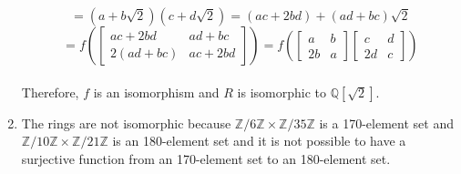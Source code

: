 \documentclass{article}
\begin{document}
\begin{enumerate}
\[ \] \[
= (a+b\sqrt2)(c+d\sqrt2) = (ac + 2bd) + (ad + bc)\sqrt2
 \] \[
 = f(\begin{bmatrix} ac+2bd & ad+bc \\ 2(ad+bc) & ac + 2bd\end{bmatrix})
 = f(\begin{bmatrix} a & b \\ 2b & a \end{bmatrix}\begin{bmatrix} c & d \\ 2d & c \end{bmatrix})
 \]
 \\
 Therefore, $f$ is an isomorphism and $R$ is isomorphic to $\mathbb{Q}[\sqrt2]$.

\item The rings are not isomorphic because
$\mathbb{Z}/6\mathbb{Z} \times \mathbb{Z}/35\mathbb{Z}$
is a 170-element set and
$\mathbb{Z}/10\mathbb{Z} \times \mathbb{Z}/21\mathbb{Z}$
is an 180-element set and it is not possible to have a surjective
function from an 170-element set to an 180-element set.

\end{enumerate}
\end{document}
